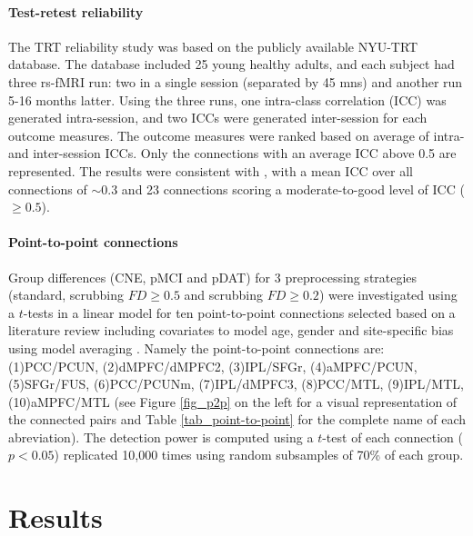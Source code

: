 \documentclass[authoryear]{elsarticle}
\begin{document}
\paragraph{Test-retest reliability}
The TRT reliability study was based on the publicly available NYU-TRT database. The database included 25 young healthy adults, and each subject had three rs-fMRI run: two in a single session (separated by 45 mns) and another run 5-16 months latter. Using the three runs, one intra-class correlation (ICC) was generated intra-session, and two ICCs were generated inter-session for each outcome measures. The outcome measures were ranked based on average of intra- and inter-session ICCs. Only the connections with an average ICC above 0.5 are represented. The results were consistent with \citep{Shehzad2009}, with a mean ICC over all connections of $\sim0.3$ and 23 connections scoring a moderate-to-good level of ICC ($\geq0.5$).

\paragraph{Point-to-point connections}
Group differences (CNE, pMCI and pDAT) for 3 preprocessing strategies (standard, scrubbing $FD\geq0.5$ and scrubbing $FD\geq0.2$) were investigated using a $t$-tests in a linear model for ten point-to-point connections selected based on a literature review including covariates to model age, gender and site-specific bias using model averaging \citep{Willer2010}. Namely the point-to-point connections are: (1)PCC/PCUN, (2)dMPFC/dMPFC2, (3)IPL/SFGr, (4)aMPFC/PCUN, (5)SFGr/FUS, (6)PCC/PCUNm, (7)IPL/dMPFC3, (8)PCC/MTL, (9)IPL/MTL, (10)aMPFC/MTL (see Figure \ref{fig_p2p} on the left for a visual representation of the connected pairs and Table \ref{tab_point-to-point} for the complete name of each abreviation). The detection power is computed using a $t$-test of each connection ($p<0.05$) replicated 10,000 times using random subsamples of 70\% of each group.



\section{Results} 
\end{document}
